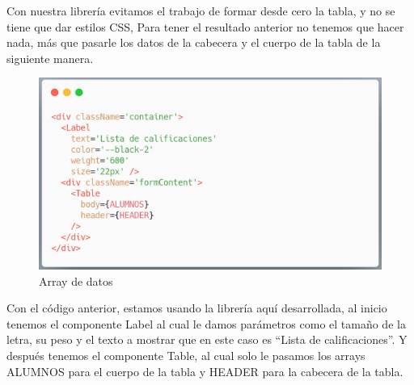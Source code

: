     Con nuestra librería evitamos el trabajo de formar desde cero la tabla, y no se tiene que dar estilos  CSS, Para tener el resultado anterior no tenemos que hacer nada, más que pasarle los datos de la cabecera y el cuerpo de la tabla de la siguiente manera.
         \newline
     \begin{figure}[H]
    \includegraphics[width=1\textwidth]{./Imagenes/table-crown.png}
     \caption[Crear nuevos directorios]{Array de datos}
         \end{figure}
    \newline
    
    Con el código anterior, estamos usando la librería aquí desarrollada, al inicio tenemos el componente Label al cual le damos parámetros como el tamaño de la letra, su peso y el texto a mostrar que en este caso es “Lista de calificaciones”. Y después tenemos el componente Table, al cual solo le pasamos los arrays ALUMNOS para el cuerpo de la tabla y HEADER para la cabecera de la tabla.
    
    